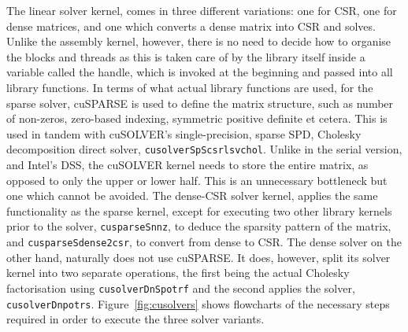 The linear solver kernel, comes in three different variations: one for CSR, one for dense matrices, and one which converts a dense matrix into CSR and solves. Unlike the assembly kernel, however, there is no need to decide how to organise the blocks and threads as this is taken care of by the library itself inside a variable called the handle, which is invoked at the beginning and passed into all library functions. In terms of what actual library functions are used, for the sparse solver, cuSPARSE is used to define the matrix structure, such as number of non-zeros, zero-based indexing, symmetric positive definite et cetera. This is used in tandem with cuSOLVER's single-precision, sparse SPD, Cholesky decomposition direct solver, \texttt{cusolverSpScsrlsvchol}. Unlike in the serial version, and Intel's DSS, the cuSOLVER kernel needs to store the entire matrix, as opposed to only the upper or lower half. This is an unnecessary bottleneck but one which cannot be avoided. The dense-CSR solver kernel, applies the same functionality as the sparse kernel, except for executing two other library kernels prior to the solver, \texttt{cusparseSnnz}, to deduce the sparsity pattern of the matrix, and \texttt{cusparseSdense2csr}, to convert from dense to CSR. The dense solver on the other hand, naturally does not use cuSPARSE. It does, however, split its solver kernel into two separate operations, the first being the actual Cholesky factorisation using \texttt{cusolverDnSpotrf} and the second applies the solver, \texttt{cusolverDnpotrs}. Figure~\ref{fig:cusolvers} shows flowcharts of the necessary steps required in order to execute the three solver variants.


